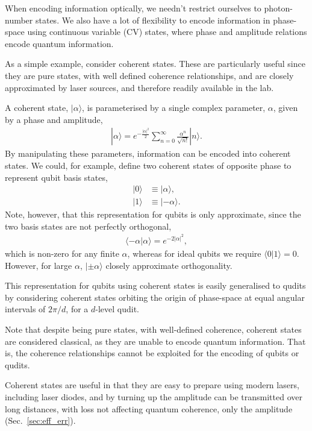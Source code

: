 \documentclass[aps,rmp,twocolumn,amsmath,amssymb,nofootinbib,superscriptaddress,longbibliography,floatfix]{revtex4-1}
\newcommand{\ket}[1]{|#1\rangle}
\begin{document}
When encoding information optically, we needn't restrict ourselves to photon-number states. We also have a lot of flexibility to encode information in phase-space using continuous variable (CV) states, where phase and amplitude relations encode quantum information.

As a simple example, consider coherent states. These are particularly useful since they are pure states, with well defined coherence relationships, and are closely approximated by laser sources, and therefore readily available in the lab.

A coherent state, $\ket\alpha$, is parameterised by a single complex parameter, $\alpha$, given by a phase and amplitude,
\begin{align}
\ket{\alpha} = e^{-\frac{|\alpha|^2}{2}} \sum_{n=0}^\infty \frac{\alpha^n}{\sqrt{n!}} \ket{n}.
\end{align}
By manipulating these parameters, information can be encoded into coherent states. We could, for example, define two coherent states of opposite phase to represent qubit basis states,
\begin{align}
\ket{0} &\equiv \ket{\alpha}, \nonumber \\
\ket{1} &\equiv \ket{-\alpha}.
\end{align}
Note, however, that this representation for qubits is only approximate, since the two basis states are not perfectly orthogonal,
\begin{align}
\langle -\alpha|\alpha \rangle = e^{-2|\alpha|^2},
\end{align}
which is non-zero for any finite $\alpha$, whereas for ideal qubits we require \mbox{$\langle 0|1\rangle = 0$}. However, for large $\alpha$, $\ket{\pm\alpha}$ closely approximate orthogonality.

This representation for qubits using coherent states is easily generalised to qudits by considering coherent states orbiting the origin of phase-space at equal angular intervals of \mbox{$2\pi/d$}, for a $d$-level qudit.

Note that despite being pure states, with well-defined coherence, coherent states are considered classical, as they are unable to encode quantum information. That is, the coherence relationships cannot be exploited for the encoding of qubits or qudits.

Coherent states are useful in that they are easy to prepare using modern lasers, including laser diodes, and by turning up the amplitude can be transmitted over long distances, with loss not affecting quantum coherence, only the amplitude (Sec.~\ref{sec:eff_err}).
\end{document}

